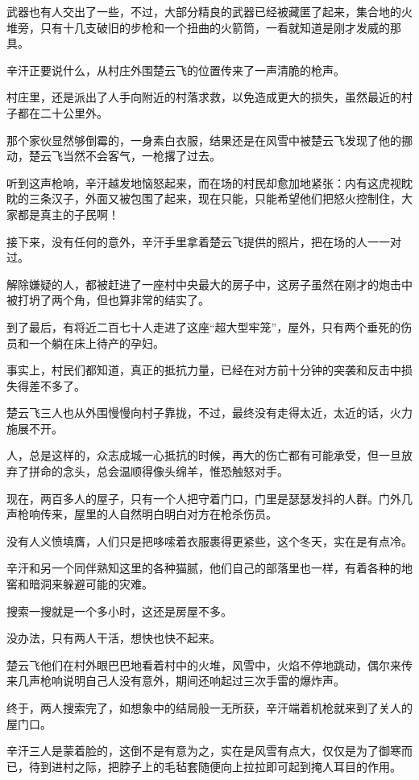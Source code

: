 武器也有人交出了一些，不过，大部分精良的武器已经被藏匿了起来，集合地的火堆旁，只有十几支破旧的步枪和一个扭曲的火箭筒，一看就知道是刚才发威的那具。

辛汗正要说什么，从村庄外围楚云飞的位置传来了一声清脆的枪声。

村庄里，还是派出了人手向附近的村落求救，以免造成更大的损失，虽然最近的村子都在二十公里外。

那个家伙显然够倒霉的，一身素白衣服，结果还是在风雪中被楚云飞发现了他的挪动，楚云飞当然不会客气，一枪撂了过去。

听到这声枪响，辛汗越发地恼怒起来，而在场的村民却愈加地紧张：内有这虎视眈眈的三条汉子，外面又被包围了起来，现在只能，只能希望他们把怒火控制住，大家都是真主的子民啊！

接下来，没有任何的意外，辛汗手里拿着楚云飞提供的照片，把在场的人一一对过。

解除嫌疑的人，都被赶进了一座村中央最大的房子中，这房子虽然在刚才的炮击中被打坍了两个角，但也算非常的结实了。

到了最后，有将近二百七十人走进了这座“超大型牢笼”，屋外，只有两个垂死的伤员和一个躺在床上待产的孕妇。

事实上，村民们都知道，真正的抵抗力量，已经在对方前十分钟的突袭和反击中损失得差不多了。

楚云飞三人也从外围慢慢向村子靠拢，不过，最终没有走得太近，太近的话，火力施展不开。

人，总是这样的，众志成城一心抵抗的时候，再大的伤亡都有可能承受，但一旦放弃了拼命的念头，总会温顺得像头绵羊，惟恐触怒对手。

现在，两百多人的屋子，只有一个人把守着门口，门里是瑟瑟发抖的人群。门外几声枪响传来，屋里的人自然明白明白对方在枪杀伤员。

没有人义愤填膺，人们只是把哆嗦着衣服裹得更紧些，这个冬天，实在是有点冷。

辛汗和另一个同伴熟知这里的各种猫腻，他们自己的部落里也一样，有着各种的地窖和暗洞来躲避可能的灾难。

搜索一搜就是一个多小时，这还是房屋不多。

没办法，只有两人干活，想快也快不起来。

楚云飞他们在村外眼巴巴地看着村中的火堆，风雪中，火焰不停地跳动，偶尔来传来几声枪响说明自己人没有意外，期间还响起过三次手雷的爆炸声。

终于，两人搜索完了，如想象中的结局般一无所获，辛汗端着机枪就来到了关人的屋门口。

辛汗三人是蒙着脸的，这倒不是有意为之，实在是风雪有点大，仅仅是为了御寒而已，待到进村之际，把脖子上的毛毡套随便向上拉拉即可起到掩人耳目的作用。

